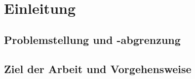 
\chapter{Einleitung}


\section{Problemstellung und -abgrenzung}

\section{Ziel der Arbeit und Vorgehensweise}
